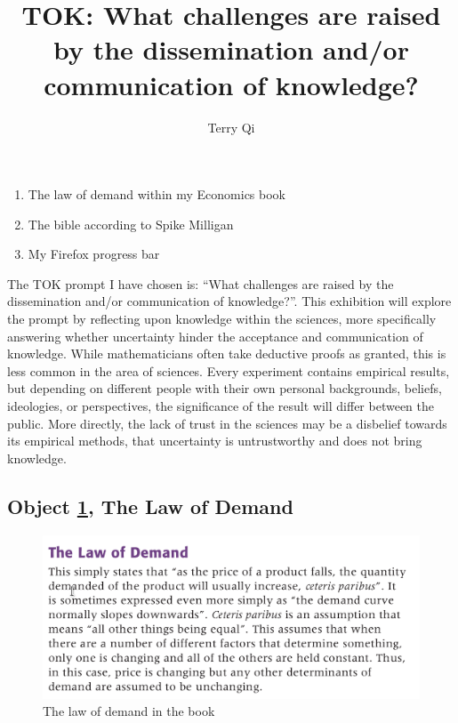 \documentclass[a4paper,12pt]{article}
\title{TOK: What challenges are raised by the dissemination and/or communication of knowledge?}
\author{Terry Qi}
\begin{document}
\maketitle
\begin{enumerate}
 \item The law of demand within my Economics book
 \item The bible according to Spike Milligan
 \item My Firefox progress bar
\end{enumerate}

\newpage



The TOK prompt I have chosen is: ``What challenges are raised by the dissemination and/or communication of knowledge?''. This exhibition will explore the prompt by reflecting upon knowledge within the sciences, more specifically answering whether uncertainty hinder the acceptance and communication of knowledge. While mathematicians often take deductive proofs as granted, this is less common in the area of sciences. Every experiment contains empirical results, but depending on different people with their own personal backgrounds, beliefs, ideologies, or perspectives, the significance of the result will differ between the public. More directly, the lack of trust in the sciences may be a disbelief towards its empirical methods, that uncertainty is untrustworthy and does not bring knowledge.


\subsection*{Object \ref{fig:lod}, The Law of Demand}

\begin{figure}[h!]
 \centering
 \includegraphics[scale=0.3]{ecobook.png}
 \caption{The law of demand in the book}
 \label{fig:lod}
\end{figure}
\end{document}
